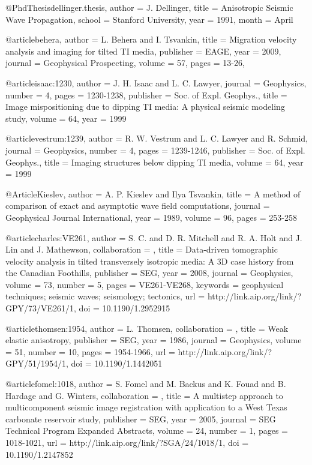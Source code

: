 {@PhdThesis{dellinger.thesis,
  author =	 {J. Dellinger},
  title =	 {Anisotropic Seismic Wave Propagation},
  school =	 {Stanford University},
  year =	 1991,
  month =	 {April}
}

@article{behera,
  author =	 {L. Behera and I. Tsvankin},
  title =	 {Migration velocity analysis and imaging for tilted
                  {TI} media},
  publisher =	 {EAGE},
  year =	 2009,
  journal =	 {Geophysical Prospecting},
  volume =	 57,
  pages =	 {13-26},
}

@article{isaac:1230,
  author =	 {J. H. Isaac and L. C. Lawyer},
  journal =	 {Geophysics},
  number =	 4,
  pages =	 {1230-1238},
  publisher =	 {Soc. of Expl. Geophys.},
  title =	 {Image mispositioning due to dipping {TI} media: {A}
                  physical seismic modeling study},
  volume =	 64,
  year =	 1999
}

@article{vestrum:1239,
  author =	 {R. W. Vestrum and L. C. Lawyer and R. Schmid},
  journal =	 {Geophysics},
  number =	 4,
  pages =	 {1239-1246},
  publisher =	 {Soc. of Expl. Geophys.},
  title =	 {Imaging structures below dipping {TI} media},
  volume =	 64,
  year =	 1999
}

@Article{Kieslev,
  author =	 {A. P. Kieslev and Ilya Tsvankin},
  title =	 {A method of comparison of exact and asymptotic wave
                  field computations},
  journal =	 {Geophysical Journal International},
  year =	 1989,
  volume =	 96,
  pages =	 {253-258}
}

@article{charles:VE261,
author = {S. C. and D. R. Mitchell and R. A. Holt and
                  J. Lin and J. Mathewson},
collaboration = {},
title = {Data-driven tomographic velocity analysis in tilted
                  transversely isotropic media: A 3{D}  case history from
                  the Canadian Foothills},
publisher = {SEG},
year = {2008},
journal = {Geophysics},
volume = {73},
number = {5},
pages = {VE261-VE268},
keywords = {geophysical techniques; seismic waves; seismology; tectonics},
url = {http://link.aip.org/link/?GPY/73/VE261/1},
doi = {10.1190/1.2952915}
}



@article{thomsen:1954,
author = {L. Thomsen},
collaboration = {},
title = {Weak elastic anisotropy},
publisher = {SEG},
year = {1986},
journal = {Geophysics},
volume = {51},
number = {10},
pages = {1954-1966},
url = {http://link.aip.org/link/?GPY/51/1954/1},
doi = {10.1190/1.1442051}
}


@article{fomel:1018,
author = {S. Fomel and M. Backus and K. Fouad and B. Hardage and G. Winters},
collaboration = {},
title = {A multistep approach to multicomponent seismic image
                  registration with application to a {W}est {T}exas
                  carbonate reservoir study},
publisher = {SEG},
year = {2005},
journal = {SEG Technical Program Expanded Abstracts},
volume = {24},
number = {1},
pages = {1018-1021},
url = {http://link.aip.org/link/?SGA/24/1018/1},
doi = {10.1190/1.2147852}
}




}
